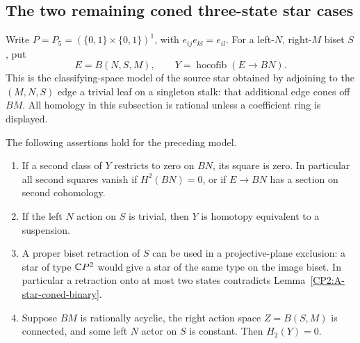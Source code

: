 \subsection{The two remaining coned three-state star cases}

Write $P=P_5=(\{0,1\}\times\{0,1\})^1$, with
$e_{ij}e_{kl}=e_{il}$.  For a left-$N$, right-$M$ biset $S$,
put
\[
 E=B(N,S,M),\qquad Y=\operatorname{hocofib}(E\longrightarrow BN).
\]
This is the classifying-space model of the source star obtained
by adjoining to the $(M,N,S)$ edge a trivial leaf on a singleton
stalk: that additional edge cones off $BM$.
All homology in this subsection is rational unless a coefficient
ring is displayed.

\begin{lemma}
\label{CP2:A-coned-bridge-comparisons}
The following assertions hold for the preceding model.
\begin{enumerate}
\item If a second class of $Y$ restricts to zero on $BN$, its
square is zero.  In particular all second squares vanish if
$H^2(BN)=0$, or if $E\to BN$ has a section on second cohomology.
\item If the left $N$ action on $S$ is trivial, then $Y$ is
homotopy equivalent to a suspension.
\item A proper biset retraction of $S$ can be used in a
projective-plane exclusion: a star of type $\mathbb{C}P^2$ would give
a star of the same type on the image biset.  In particular a
retraction onto at most two states contradicts
Lemma~\ref{CP2:A-star-coned-binary}.
\item Suppose $BM$ is rationally acyclic, the right action
space $Z=B(S,M)$ is connected, and some left $N$ actor on $S$
is constant.  Then $H_2(Y)=0$.
\end{enumerate}
\end{lemma}
